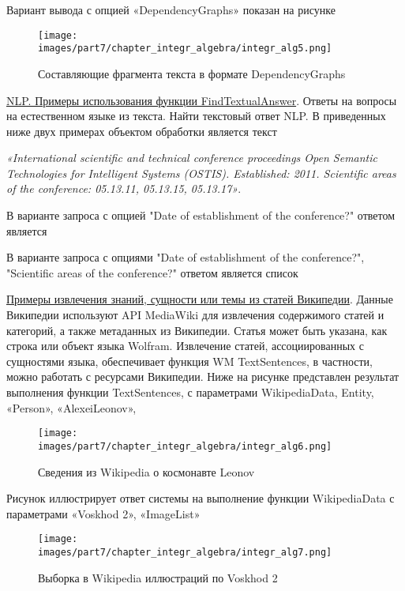 Вариант вывода с опцией «DependencyGraphs» показан на рисунке \textit{}
\begin{figure}[h]
	\centering
	\texttt{[image: images/part7/chapter\_integr\_algebra/integr\_alg5.png]}
	\caption{Составляющие фрагмента текста в формате DependencyGraphs}
	\label{fig:integr_alg5}
\end{figure}

\underline{NLP. Примеры использования функции FindTextualAnswer}.
Ответы на вопросы на естественном языке из текста. Найти текстовый ответ NLP. 
В приведенных ниже двух примерах объектом обработки является текст 

\textit{«International scientific and technical conference proceedings Open Semantic Technologies for Intelligent Systems (OSTIS). Established: 2011. Scientific areas of the conference: 05.13.11, 05.13.15, 05.13.17»}.

В варианте запроса с опцией "Date of establishment of the conference?" ответом является
\begin{center}
\end{center}
В варианте запроса с опциями "Date of establishment of the conference?", "Scientific areas of the conference?" ответом является список 
\begin{center}
\end{center}

\underline{Примеры извлечения знаний, сущности или темы из статей Википедии}.
Данные Википедии используют API MediaWiki для извлечения содержимого статей и категорий, а также метаданных из Википедии. Статья может быть указана, как строка или объект языка Wolfram. 
Извлечение статей, ассоциированных с сущностями языка, обеспечивает функция WM TextSentences, в частности, можно работать с ресурсами Википедии. 
Ниже на рисунке \textit{} представлен результат выполнения функции TextSentences, с параметрами WikipediaData, Entity, «Person», «AlexeiLeonov», 
\begin{figure}[h]
	\centering
	\texttt{[image: images/part7/chapter\_integr\_algebra/integr\_alg6.png]}
	\caption{Сведения из Wikipedia о космонавте Leonov}
	\label{fig:integr_alg6}
\end{figure}

Рисунок \textit{} иллюстрирует ответ системы на выполнение функции WikipediaData с параметрами «Voskhod 2», «ImageList»
\begin{figure}[h]
	\centering
	\texttt{[image: images/part7/chapter\_integr\_algebra/integr\_alg7.png]}
	\caption{Выборка в Wikipedia иллюстраций по Voskhod 2}
	\label{fig:integr_alg7}
\end{figure}


